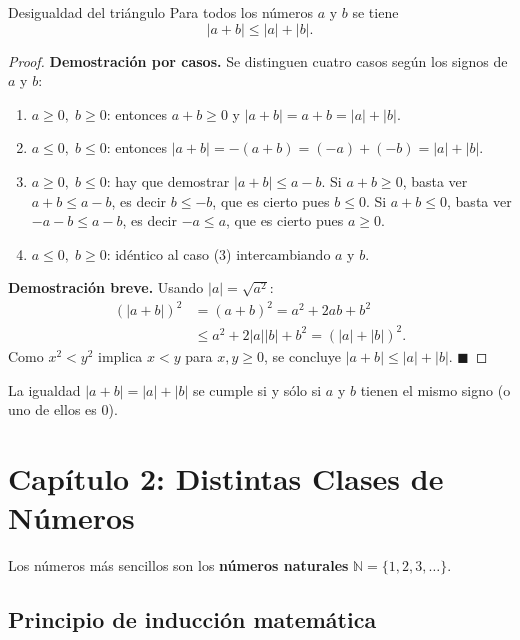 \documentclass[12pt]{article}
\begin{document}
\begin{teorema}[1]{Desigualdad del triángulo}
Para todos los números $a$ y $b$ se tiene
\[ |a + b| \leq |a| + |b|. \]
\end{teorema}

\begin{proof}
\textbf{Demostración por casos.} Se distinguen cuatro casos según los signos de $a$ y $b$:
\begin{enumerate}
  \item $a \geq 0,\; b \geq 0$: entonces $a + b \geq 0$ y $|a+b| = a+b = |a|+|b|$. \checkmark
  \item $a \leq 0,\; b \leq 0$: entonces $|a+b| = -(a+b) = (-a)+(-b) = |a|+|b|$. \checkmark
  \item $a \geq 0,\; b \leq 0$: hay que demostrar $|a+b| \leq a - b$. Si $a+b \geq 0$, basta ver $a+b \leq a-b$, es decir $b \leq -b$, que es cierto pues $b \leq 0$. Si $a+b \leq 0$, basta ver $-a-b \leq a-b$, es decir $-a \leq a$, que es cierto pues $a \geq 0$. \checkmark
  \item $a \leq 0,\; b \geq 0$: idéntico al caso (3) intercambiando $a$ y $b$. \checkmark
\end{enumerate}
\textbf{Demostración breve.} Usando $|a| = \sqrt{a^2}$:
\begin{align*}
(|a+b|)^2 &= (a+b)^2 = a^2 + 2ab + b^2 \\
           &\leq a^2 + 2|a||b| + b^2 = (|a|+|b|)^2.
\end{align*}
Como $x^2 < y^2$ implica $x < y$ para $x, y \geq 0$, se concluye $|a+b| \leq |a|+|b|$.
$\blacksquare$
\end{proof}

\begin{observacion}[]{}
La igualdad $|a+b| = |a| + |b|$ se cumple si y sólo si $a$ y $b$ tienen el mismo signo (o uno de ellos es $0$).
\end{observacion}

\section{Capítulo 2: Distintas Clases de Números}

Los números más sencillos son los \textbf{números naturales} $\mathbb{N} = \{1, 2, 3, \ldots\}$.

\subsection{Principio de inducción matemática}
\end{document}
